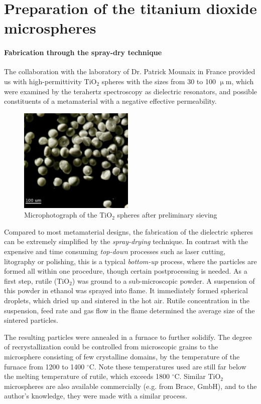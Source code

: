 
\section{Preparation of the titanium dioxide microspheres}
\paragraph{Fabrication through the spray-dry technique}%
The collaboration with the laboratory of Dr. Patrick Mounaix in France %
provided us with high-permittivity TiO$_{2}$ spheres with the sizes from 30 to 100 $\upmu$m, which were examined by the terahertz spectroscopy as dielectric resonators, and possible constituents of a metamaterial with a negative effective permeability.
\begin{figure}[ht] \caption{Microphotograph of the TiO$_{2}$ spheres after preliminary sieving} \label{fg_microphoto} \centering 
\includegraphics[height=5cm]{img/microscope_TiO2_particles.pdf}
\end{figure}

Compared to most metamaterial designs, the fabrication of the dielectric spheres can be extremely simplified by the \textit{spray-drying} technique. In contrast with the expensive and time consuming \textit{top-down} processes such as laser cutting, litography or polishing, this is a typical \textit{bottom-up} process, where the particles are formed all within one procedure, though certain postprocessing is needed. 
As a first step, rutile (TiO$_{2}$) was ground to a sub-microscopic powder. A suspension of this powder in ethanol was sprayed into flame. It immediately formed spherical droplets, which dried up and sintered in the hot air. Rutile concentration in the suspension, feed rate and gas flow in the flame determined the average size of the sintered particles.

The resulting particles were annealed in a furnace to further solidify. The degree of recrystallization could be controlled  from microscopic grains to the microsphere consisting of few crystalline domains, by the temperature of the furnace from 1200 to 1400 $^{\circ}$C. Note these temperatures used are still far below the melting temperature of rutile, which exceeds 1800 $^{\circ}$C.
Similar TiO$_{2}$ microspheres are also available commercially (e.g. from Brace, GmbH), and to the author's knowledge, they were made with a similar process.

